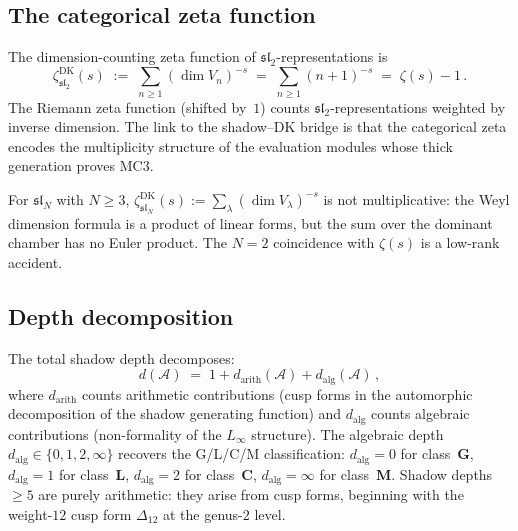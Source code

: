 \documentclass[11pt,reqno]{amsart}
\theoremstyle{definition}
\theoremstyle{remark}
\newcommand{\cA}{\mathcal{A}}
\numberwithin{equation}{section}
\begin{document}
\subsection{The categorical zeta function}
\label{ssec:categorical-zeta}

The dimension-counting zeta function of
$\mathfrak{sl}_2$-representations is
\begin{equation}\label{eq:cat-zeta}
\zeta^{\mathrm{DK}}_{\mathfrak{sl}_2}(s)
\;:=\;
\sum_{n \ge 1} (\dim V_n)^{-s}
\;=\;
\sum_{n \ge 1}(n+1)^{-s}
\;=\;
\zeta(s) - 1\,.
\end{equation}
The Riemann zeta function (shifted by~$1$) counts
$\mathfrak{sl}_2$-representations weighted by inverse
dimension. The link to the shadow--DK bridge is that
the categorical zeta encodes the multiplicity structure
of the evaluation modules whose thick generation proves
MC3.

For $\mathfrak{sl}_N$ with $N \ge 3$,
$\zeta^{\mathrm{DK}}_{\mathfrak{sl}_N}(s) :=
\sum_\lambda (\dim V_\lambda)^{-s}$ is not
multiplicative: the Weyl dimension formula is a product
of linear forms, but the sum over the dominant chamber
has no Euler product. The $N = 2$ coincidence with
$\zeta(s)$ is a low-rank accident.

\subsection{Depth decomposition}
\label{ssec:depth}

The total shadow depth decomposes:
\begin{equation}\label{eq:depth-decomposition}
d(\cA)
\;=\;
1 + d_{\mathrm{arith}}(\cA) + d_{\mathrm{alg}}(\cA)\,,
\end{equation}
where $d_{\mathrm{arith}}$ counts arithmetic contributions
(cusp forms in the automorphic decomposition of the shadow
generating function) and $d_{\mathrm{alg}}$ counts
algebraic contributions (non-formality of the $L_\infty$
structure). The algebraic depth
$d_{\mathrm{alg}} \in \{0, 1, 2, \infty\}$ recovers
the G/L/C/M classification: $d_{\mathrm{alg}} = 0$
for class~$\mathbf{G}$, $d_{\mathrm{alg}} = 1$ for
class~$\mathbf{L}$, $d_{\mathrm{alg}} = 2$ for
class~$\mathbf{C}$,
$d_{\mathrm{alg}} = \infty$ for class~$\mathbf{M}$.
Shadow depths $\ge 5$ are purely arithmetic: they arise
from cusp forms, beginning with the weight-$12$ cusp
form $\Delta_{12}$ at the genus-$2$ level.
\end{document}
